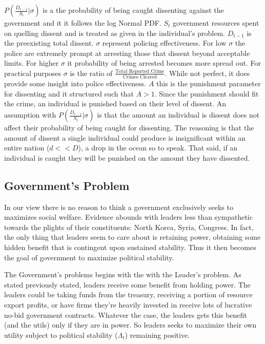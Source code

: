 \documentclass[12pt]{article}
\begin{document}
\begin{spacing}{1.5}



$P \left(\frac{D_{t-1}}{S_t}\Big|\sigma \right)$ is a the probability of being caught dissenting against the government and it it follows the log Normal PDF. $S_t$ government resources spent on quelling dissent and is treated as given in the individual's problem. $D_{t-1}$ is the preexisting total dissent. $\sigma$ represent policing effectiveness. For low $\sigma$ the police are extremely prompt at arresting those that dissent beyond acceptable limits. For higher $\sigma$ it probability of being arrested becomes more spread out. For practical purposes $\sigma$ is the ratio of $\frac{\text{Total Reported Crime}}{\text{Crimes Cleared}}$. While not perfect, it does provide some insight into police effectiveness. $A$ this is the punishment parameter for dissenting and it structured such that $A>1$. Since the punishment should fit the crime, an individual is punished based on their level of dissent. An assumption with $P \left(\frac{D_{t-1}}{S_t}\Big|\sigma \right)$ is that the amount an individual is dissent does not affect their probability of being caught for dissenting. The reasoning is that the amount of dissent a single individual could produce is insignificant within an entire nation ($d<<D$), a drop in the ocean so to speak. That said, if an individual is caught they will be punished on the amount they have dissented.   


\subsection{Government's Problem} 

In our view there is no reason to think a government exclusively seeks to maximizes social welfare. Evidence abounds with leaders less than sympathetic towards the plights of their constituents: North Korea, Syria, Congress. In fact, the only thing that leaders seem to care about is retaining power, obtaining some hidden benefit that is contingent upon sustained stability. Thus it then becomes the goal of government to maximize political stability. 

The Government's problems begins with the with the Leader's problem. As stated previously stated, leaders receive some benefit from holding power. The leaders could be taking funds from the treasury, receiving a portion of resource export profits, or have firms they're heavily invested in receive lots of lucrative no-bid government contracts. Whatever the case, the leaders gets this benefit (and the utils) only if they are in power. So leaders seeks to maximize their own utility subject to political stability ($\Lambda_t$) remaining positive.


\end{spacing}
\end{document}
